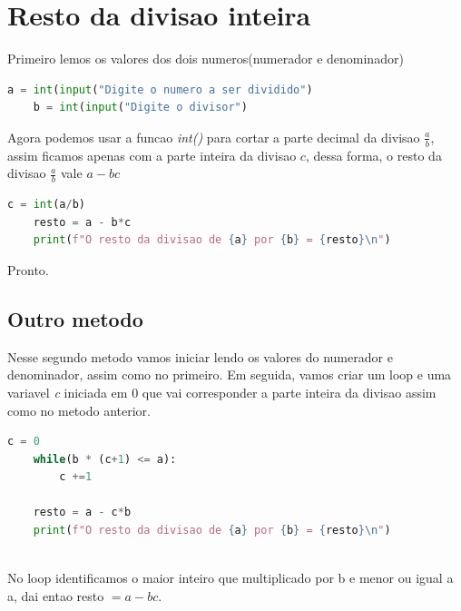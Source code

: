 \documentclass{article}
\begin{document}
\section{Resto da divisao inteira}

Primeiro lemos os valores dos dois numeros(numerador e denominador)


    \begin{lstlisting}[language=Python]
    a = int(input("Digite o numero a ser dividido")
    b = int(input("Digite o divisor")\end{lstlisting}

Agora podemos usar a funcao \textit{int()} para cortar a parte decimal da divisao $\frac{a}{b}$, assim ficamos apenas com a parte inteira da divisao $c$, dessa forma, o resto da divisao $\frac{a}{b}$ vale $a - bc$

\begin{lstlisting}[language=Python]
    c = int(a/b)
    resto = a - b*c
    print(f"O resto da divisao de {a} por {b} = {resto}\n")\end{lstlisting}


Pronto.

\subsection{Outro metodo}

Nesse segundo metodo vamos iniciar lendo os valores do numerador e denominador, assim como no primeiro. Em seguida, vamos criar um loop e uma variavel \textit{c} iniciada em 0 que vai corresponder a parte inteira da divisao assim como no metodo anterior.

\begin{lstlisting}[language=Python]
    c = 0
    while(b * (c+1) <= a):
        c +=1

    resto = a - c*b
    print(f"O resto da divisao de {a} por {b} = {resto}\n")
    
    \end{lstlisting}
No loop identificamos o maior inteiro que multiplicado por b e menor ou igual a a, dai entao resto $= a - bc$.
\end{document}
